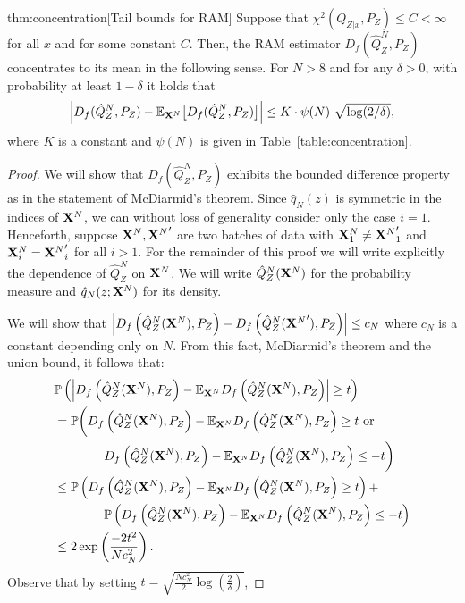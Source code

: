 \begin{reptheorem}{thm:concentration}[Tail bounds for RAM]
Suppose that ${\chi^2\left(Q_{Z|x} , P_Z\right) \leq C < \infty}$ for all $x$ and for some constant $C$.
Then, the RAM estimator ${D_f( \hat{Q}_Z^N , P_Z)}$ concentrates to its mean in the following sense. 
For $N>8$ and for any $\delta >0$, with probability at least $1-\delta$ it holds that
\begin{align*}
    \left| D_f( \hat{Q}_Z^N , P_Z) - \mathbb{E}_{\mathbf{X}^N} \bigl[D_f(\hat{Q}_Z^N , P_Z)\bigr] \right| \leq {K \cdot \psi(N)} \  \sqrt{\log (2/\delta)},
\end{align*}
where $K$ is a constant and $\psi(N)$ is given in Table~\ref{table:concentration}.
\end{reptheorem}
\begin{proof}
We will show that $D_f\left( \hat{Q}_Z^N , P_Z\right)$ exhibits the bounded difference property as in the statement of McDiarmid's theorem.
Since $\hat{q}_N(z)$ is symmetric in the indices of $\mathbf{X}^N$, we can without loss of generality consider only the case $i=1$.
Henceforth, suppose $\mathbf{X}^N, {\mathbf{X}^N}'$ are two batches of data with $\mathbf{X}^N_1 \not= {\mathbf{X}^N}'_1$ and $\mathbf{X}^N_i = {\mathbf{X}^N}'_i$ for all $i > 1$. 
For the remainder of this proof we will write explicitly the dependence of $\hat{Q}_Z^N$ on $\mathbf{X}^N$. 
We will write $\hat{Q}_Z^N(\mathbf{X}^N)$ for the probability measure and $\hat{q}_N(z; \mathbf{X}^N)$ for its density.


We will show that $\left|D_f\left( \hat{Q}_Z^N(\mathbf{X}^N) , P_Z\right) - D_f\left( \hat{Q}_Z^N({\mathbf{X}^N}') , P_Z\right)\right| \leq c_N$ where $c_N$ is a constant depending only on $N$.
From this fact, McDiarmid's theorem and the union bound, it follows that:
\begin{align*}
    &\mathbb{P}\left( \left| D_f\left( \hat{Q}_Z^N(\mathbf{X}^N) , P_Z\right) - \mathbb{E}_{\mathbf{X}^N} D_f\left( \hat{Q}_Z^N(\mathbf{X}^N) , P_Z\right) \right|\geq t \right) \\
    &= \mathbb{P}\bigg( D_f\left( \hat{Q}_Z^N(\mathbf{X}^N) , P_Z\right) - \mathbb{E}_{\mathbf{X}^N} D_f\left( \hat{Q}_Z^N(\mathbf{X}^N) , P_Z\right) \geq t \text{ or }\\
    & \qquad \qquad D_f\left( \hat{Q}_Z^N(\mathbf{X}^N) , P_Z\right) - \mathbb{E}_{\mathbf{X}^N} D_f\left( \hat{Q}_Z^N(\mathbf{X}^N) , P_Z\right) \leq -t\bigg) \\
    &\leq \mathbb{P}\left( D_f\left( \hat{Q}_Z^N(\mathbf{X}^N) , P_Z\right) - \mathbb{E}_{\mathbf{X}^N} D_f\left( \hat{Q}_Z^N(\mathbf{X}^N) , P_Z\right) \geq t \right) 
    + \\
    & \qquad \qquad \mathbb{P}\left( D_f\left( \hat{Q}_Z^N(\mathbf{X}^N) , P_Z\right) - \mathbb{E}_{\mathbf{X}^N} D_f\left( \hat{Q}_Z^N(\mathbf{X}^N) , P_Z\right) \leq -t\right) \\
    &\leq 2 \exp\left(\frac{-2 t^2 }{Nc^2_N} \right).
\end{align*}
Observe that by setting $t = \sqrt{\frac{Nc_N^2}{2} \log\left(\frac{2}{\delta}\right)}$, 


\end{proof}
